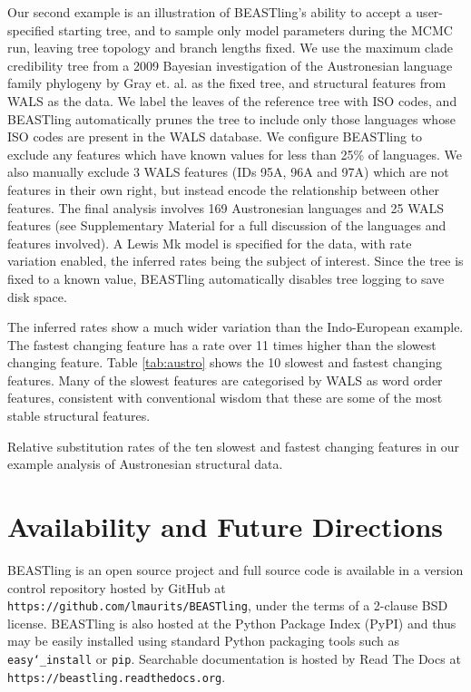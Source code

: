 \documentclass[twocolumn,10pt]{scrartcl}
\begin{document}
Our second example is an illustration of BEASTling's ability to accept a user-specified starting tree, and to sample only model parameters during the MCMC run, leaving tree topology and branch lengths fixed.  We use the maximum clade credibility tree from a 2009 Bayesian investigation of the Austronesian language family phylogeny by Gray et. al.\cite{Gray2009} as the fixed tree, and structural features from WALS as the data.  We label the leaves of the reference tree with ISO codes, and BEASTling automatically prunes the tree to include only those languages whose ISO codes are present in the WALS database.  We configure BEASTling to exclude any features which have known values for less than 25\% of languages.  We also manually exclude 3 WALS features (IDs 95A, 96A and 97A) which are not features in their own right, but instead encode the relationship between other features.  The final analysis involves 169 Austronesian languages and 25 WALS features (see Supplementary Material for a full discussion of the languages and features involved).  A Lewis Mk model is specified for the data, with rate variation enabled, the inferred rates being the subject of interest.  Since the tree is fixed to a known value, BEASTling automatically disables tree logging to save disk space.

The inferred rates show a much wider variation than the Indo-European example.  The fastest changing feature has a rate over 11 times higher than the slowest changing feature.  Table \ref{tab:austro} shows the 10 slowest and fastest changing features.  Many of the slowest features are categorised by WALS as word order features, consistent with conventional wisdom that these are some of the most stable structural features.

\begin{table*}[ht]
	\begin{center}
		
	\end{center}
	\caption{Relative substitution rates of the ten slowest and fastest changing features in our example analysis of Austronesian structural data.}
\label{tab:austro}
\end{table*}

\section{Availability and Future Directions}

BEASTling is an open source project and full source code is available in a version control repository hosted by GitHub at \texttt{https://github.com/lmaurits/BEASTling}, under the terms of a 2-clause BSD license.  BEASTling is also hosted at the Python Package Index (PyPI) and thus may be easily installed using standard Python packaging tools such as \texttt{easy\char`_install} or \texttt{pip}.  Searchable documentation is hosted by Read The Docs at \texttt{https://beastling.readthedocs.org}.
\end{document}
